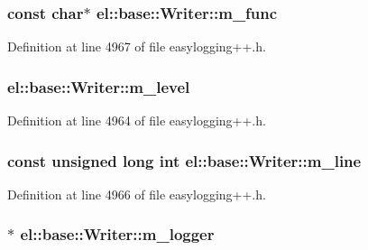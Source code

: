 \subsubsection[{m\+\_\+func}]{\setlength{\rightskip}{0pt plus 5cm}const char$\ast$ el\+::base\+::\+Writer\+::m\+\_\+func\hspace{0.3cm}{\ttfamily [protected]}}\label{classel_1_1base_1_1_writer_a57291e0751fe93547d9d5551fb3e8415}


Definition at line 4967 of file easylogging++.\+h.

\hypertarget{classel_1_1base_1_1_writer_a28522bf9b05b4edcc0baf5196645d317}{}
\subsubsection[{m\+\_\+level}]{ el\+::base\+::\+Writer\+::m\+\_\+level\hspace{0.3cm}{\ttfamily [protected]}}\label{classel_1_1base_1_1_writer_a28522bf9b05b4edcc0baf5196645d317}


Definition at line 4964 of file easylogging++.\+h.

\hypertarget{classel_1_1base_1_1_writer_ac71f81d43f58b80ea31ae248e9fe6a23}{}
\subsubsection[{m\+\_\+line}]{\setlength{\rightskip}{0pt plus 5cm}const unsigned long int el\+::base\+::\+Writer\+::m\+\_\+line\hspace{0.3cm}{\ttfamily [protected]}}\label{classel_1_1base_1_1_writer_ac71f81d43f58b80ea31ae248e9fe6a23}


Definition at line 4966 of file easylogging++.\+h.

\hypertarget{classel_1_1base_1_1_writer_a0fab2e9a168b7973bcca4574d05490d2}{}
\subsubsection[{m\+\_\+logger}]{$\ast$ el\+::base\+::\+Writer\+::m\+\_\+logger\hspace{0.3cm}{\ttfamily [protected]}}\label{classel_1_1base_1_1_writer_a0fab2e9a168b7973bcca4574d05490d2}


